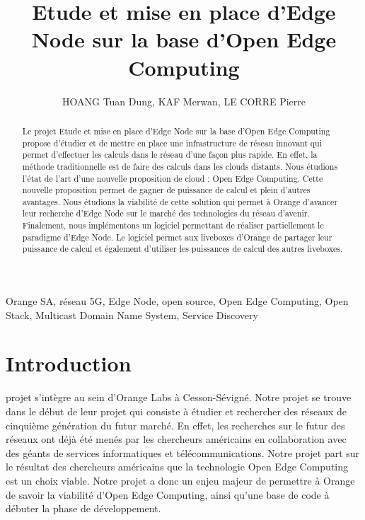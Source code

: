 \documentclass[twocolumn,a4paper]{IEEEtranfr}
\begin{document}
\title{Etude et mise en place d'Edge Node sur la base d'Open Edge Computing}
\author{HOANG Tuan Dung, KAF Merwan, LE CORRE Pierre} 

\maketitle

\begin{abstract}
Le projet Etude et mise en place d'Edge Node sur la base d'Open Edge Computing propose d'étudier et de mettre en place une infrastructure de réseau innovant qui permet d'effectuer les calculs dans le réseau d'une façon plus rapide. En effet, la méthode traditionnelle est de faire des calculs dans les clouds distants. Nous étudions l'état de l'art d'une nouvelle proposition de cloud : Open Edge Computing. Cette nouvelle proposition permet de gagner de puissance de calcul et plein d'autres avantages. Nous étudions la viabilité de cette solution qui permet à Orange d'avancer leur recherche d'Edge Node sur le marché des technologies du réseau d'avenir. Finalement, nous implémentons un logiciel permettant de réaliser partiellement le paradigme d'Edge Node. Le logiciel permet aux liveboxes d'Orange de partager leur puissance de calcul et également d'utiliser les puissances de calcul des autres liveboxes.
\end{abstract} 

\begin{keywords}
Orange SA, réseau 5G, Edge Node, open source, Open Edge Computing, Open Stack, Multicast Domain Name System, Service Discovery
\end{keywords}



\section{Introduction}

 projet s'intègre au sein d'Orange Labs à Cesson-Sévigné. Notre projet se trouve dans le début de leur projet qui consiste à étudier et rechercher des réseaux de cinquième génération du futur marché. En effet, les recherches sur le futur des réseaux ont déjà été menés par les chercheurs américains en collaboration avec des géants de services informatiques et télécommunications. Notre projet part sur le résultat des chercheurs américains que la technologie Open Edge Computing est un choix viable. Notre projet a donc un enjeu majeur de permettre à Orange de savoir la viabilité d'Open Edge Computing, ainsi qu'une base de code à débuter la phase de développement.
\end{document}
